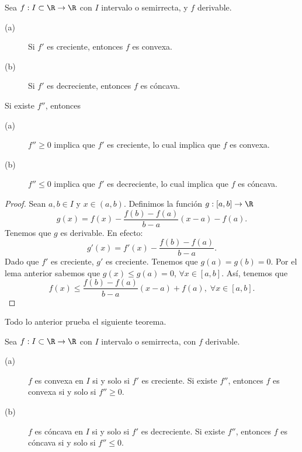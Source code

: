 \begin{fprop}[]
\normalfont Sea $\displaystyle f : I \subset \R \to \R $ con $\displaystyle I $ intervalo o semirrecta, y $\displaystyle f $ derivable. 
\begin{description}
\item[(a)] Si $\displaystyle f' $ es creciente, entonces $\displaystyle f $ es convexa.
\item[(b)] Si $\displaystyle f' $ es decreciente, entonces $\displaystyle f $ es cóncava.
\end{description}
\end{fprop}
\begin{observation}
\normalfont Si existe $\displaystyle f'' $, entonces 
\begin{description}
\item[(a)] $\displaystyle f'' \geq 0  $ implica que $\displaystyle f' $ es creciente, lo cual implica que $\displaystyle f $ es convexa.
\item[(b)] $\displaystyle f'' \leq 0 $ implica que $\displaystyle f' $ es decreciente, lo cual implica que $\displaystyle f $ es cóncava.
\end{description}
\end{observation}
\begin{proof}
	Sean $\displaystyle a,b \in I $ y $\displaystyle x \in \left(a,b\right) $. Definimos la función $\displaystyle g : [a,b] \to \R $  
\[ g\left(x\right) = f\left(x\right)-\frac{f\left(b\right)-f\left(a\right)}{b-a}\left(x-a\right)-f\left(a\right) .\]
Tenemos que $\displaystyle g $ es derivable. En efecto:
\[g'\left(x\right) = f'\left(x\right)-\frac{f\left(b\right)-f\left(a\right)}{b-a} .\]
Dado que $\displaystyle f' $ es creciente, $\displaystyle g' $ es creciente. Tenemos que $\displaystyle g\left(a\right) = g\left(b\right) = 0 $. Por el lema anterior sabemos que $\displaystyle g\left(x\right) \leq g\left(a\right) = 0 $, $\displaystyle \forall x \in \left[a,b\right] $. Así, tenemos que 
\[ f\left(x\right) \leq \frac{f\left(b\right)-f\left(a\right)}{b-a}\left(x-a\right) + f\left(a\right), \; \forall x \in [a,b] .\]
\end{proof}
Todo lo anterior prueba el siguiente teorema.
\begin{ftheorem}[]
\normalfont Sea $\displaystyle f: I \subset \R \to \R  $ con $\displaystyle I $ intervalo o semirrecta, con $\displaystyle f $ derivable.
\begin{description}
\item[(a)] $\displaystyle f $ es convexa en $\displaystyle I $ si y solo si $\displaystyle f' $ es creciente. Si existe $\displaystyle f'' $, entonces $\displaystyle f $ es convexa si y solo si $\displaystyle f'' \geq 0 $.
\item[(b)] $\displaystyle f $ es cóncava en $\displaystyle I $ si y solo si $\displaystyle f' $ es decreciente. Si existe $\displaystyle f'' $, entonces $\displaystyle f $ es cóncava si y solo si $\displaystyle f'' \leq 0 $.
\end{description}
\end{ftheorem}
